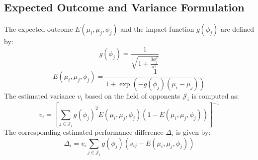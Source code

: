 \subsection{Expected Outcome and Variance Formulation}
The expected outcome $E(\mu_i, \mu_j, \phi_j)$ and the impact function $g(\phi_j)$ are defined by:
\begin{equation}
g(\phi_j) = \frac{1}{\sqrt{1 + \frac{3\phi_j^2}{\pi^2}}}
\label{eq:g_function}
\end{equation}
\begin{equation}
E(\mu_i, \mu_j, \phi_j) = \frac{1}{1 + \exp\left( -g(\phi_j)(\mu_i - \mu_j) \right)}
\label{eq:expected_outcome}
\end{equation}
The estimated variance $v_i$ based on the field of opponents $\mathcal{J}_i$ is computed as:
\begin{equation}
v_i = \left[ \sum_{j \in \mathcal{J}_i} g(\phi_j)^2 E(\mu_i, \mu_j, \phi_j) \left( 1 - E(\mu_i, \mu_j, \phi_j) \right) \right]^{-1}
\label{eq:variance_v}
\end{equation}
The corresponding estimated performance difference $\Delta_i$ is given by:
\begin{equation}
\Delta_i = v_i \sum_{j \in \mathcal{J}_i} g(\phi_j) \left( s_{ij} - E(\mu_i, \mu_j, \phi_j) \right)
\label{eq:delta_difference}
\end{equation}

